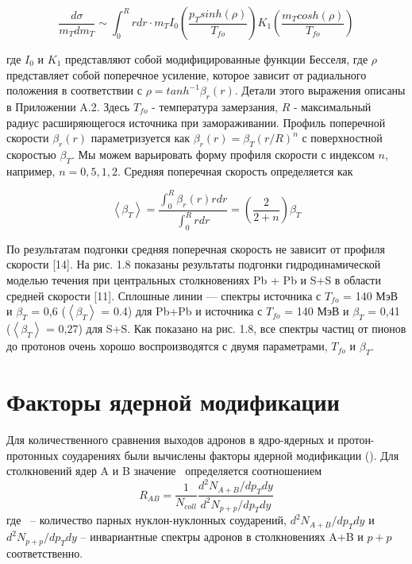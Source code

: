 \begin{linenomath}
	\begin{equation}
		\frac{d \sigma}{m_T dm_T} \sim \int_0^R r dr \cdot m_T 
		I_0 \left(\frac{p_T sinh(\rho)}{T_{fo}}\right) K_1 \left(\frac{m_T cosh(\rho)}{T_{fo}} \right)
	\end{equation}
\end{linenomath}
где $I_0$ и $K_1$ представляют собой модифицированные функции Бесселя, где $\rho$ представляет собой поперечное усиление, которое зависит от радиального положения в соответствии с $\rho = tanh^{-1} \beta_r(r)$. Детали этого выражения описаны в Приложении A.2. Здесь $T_{fo}$ - температура замерзания, $R$ - максимальный радиус расширяющегося источника при замораживании. Профиль поперечной скорости $\beta_r(r)$ параметризуется как $\beta_r(r) = \beta_T(r/R)^n$ с поверхностной скоростью $\beta_T$. Мы можем варьировать форму профиля скорости с индексом $n$, например, $n = 0,5,1,2$. Средняя поперечная скорость определяется как
\begin{linenomath}
	\begin{equation}
		\left< \beta_T \right> = \frac{\int_0^R \beta_r(r)r dr}{\int_0^R r dr} = \left(\frac{2}{2+n} \right)\beta_T
	\end{equation}
\end{linenomath}
По результатам подгонки средняя поперечная скорость не зависит от профиля скорости [14]. На рис. 1.8 показаны результаты подгонки гидродинамической моделью течения при центральных столкновениях Pb + Pb и S+S в области средней скорости [11]. Сплошные линии — спектры источника с $T_{fo}$ = 140 МэВ и $\beta_T$ = 0,6 ($\left< \beta_T \right>$ = 0.4) для Pb+Pb и источника с $T_{fo}$ = 140 МэВ и $\beta_T$ = 0,41 ($\left< \beta_T \right>$ = 0,27) для S+S. Как показано на рис. 1.8, все спектры частиц от пионов до протонов очень хорошо воспроизводятся с двумя параметрами, $T_{fo}$ и $\beta_T$.

\section{Факторы ядерной модификации}
Для количественного сравнения выходов адронов в ядро-ядерных и протон-протонных соударениях были вычислены факторы ядерной модификации (\rab). Для столкновений ядер A и B значение \rab \ определяется соотношением
\begin{equation}
	\label{eq:rab}
	R_{AB}=\frac{1}{N_{coll}}\frac{d^2 N_{A+B}/dp_T dy}{d^2 N_{p+p}/dp_T dy} 
\end{equation}
где \Ncoll \ – количество парных нуклон-нуклонных соударений, 
$d^2 N_{A+B}/dp_T dy$ и $d^2 N_{p+p}/dp_T dy$ – инвариантные спектры адронов в столкновениях A+B и $p+p$ соответственно.



